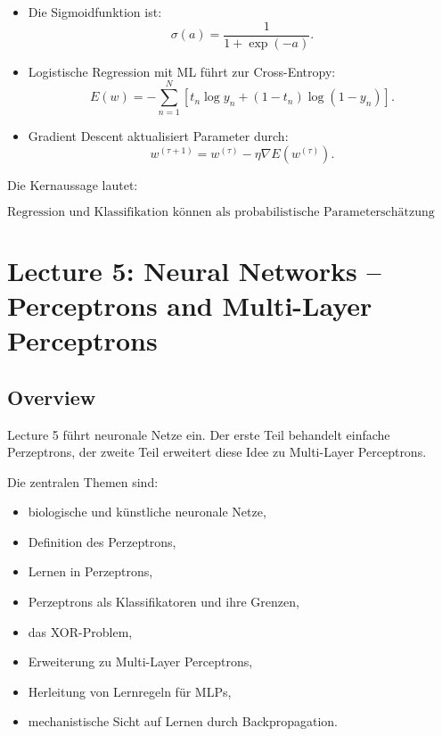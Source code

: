 \documentclass[11pt,a4paper]{scrartcl}
\begin{document}
\begin{answerbox}
\begin{itemize}
        \item Die Sigmoidfunktion ist:
        \[
            \sigma(a)
            =
            \frac{1}{1+\exp(-a)}.
        \]

        \item Logistische Regression mit ML führt zur Cross-Entropy:
        \[
            E(w)
            =
            -
            \sum_{n=1}^{N}
            \left[
                t_n\log y_n
                +
                (1-t_n)\log(1-y_n)
            \right].
        \]

        \item Gradient Descent aktualisiert Parameter durch:
        \[
            w^{(\tau+1)}
            =
            w^{(\tau)}
            -
            \eta
            \nabla E(w^{(\tau)}).
        \]
    \end{itemize}

    Die Kernaussage lautet:

    \[
        \boxed{
            \text{Regression und Klassifikation können als probabilistische
            Parameterschätzung formuliert werden.}
        }
    \]
\end{answerbox}

\section{Lecture 5: Neural Networks -- Perceptrons and Multi-Layer Perceptrons}

\subsection{Overview}

\begin{notebox}
    Lecture 5 führt neuronale Netze ein. Der erste Teil behandelt einfache
    Perzeptrons, der zweite Teil erweitert diese Idee zu Multi-Layer
    Perceptrons.

    Die zentralen Themen sind:

    \begin{itemize}
        \item biologische und künstliche neuronale Netze,
        \item Definition des Perzeptrons,
        \item Lernen in Perzeptrons,
        \item Perzeptrons als Klassifikatoren und ihre Grenzen,
        \item das XOR-Problem,
        \item Erweiterung zu Multi-Layer Perceptrons,
        \item Herleitung von Lernregeln für MLPs,
        \item mechanistische Sicht auf Lernen durch Backpropagation.
    \end{itemize}
\end{notebox}
\end{document}
